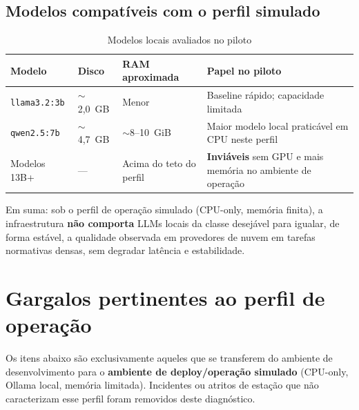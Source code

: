 \documentclass[12pt, a4paper]{article}
\begin{document}
\subsection{Modelos compatíveis com o perfil simulado}

\begin{table}[H]
\centering
\small
\caption{Modelos locais avaliados no piloto}
\label{tab:modelos}
\begin{tabularx}{\textwidth}{
  >{\raggedright\arraybackslash}p{2.6cm}
  >{\centering\arraybackslash}p{2.0cm}
  >{\raggedright\arraybackslash}p{3.2cm}
  >{\raggedright\arraybackslash}X
}
\toprule
\textbf{Modelo} & \textbf{Disco} & \textbf{RAM aproximada} & \textbf{Papel no piloto} \\
\midrule
\texttt{llama3.2:3b} & $\sim$2,0~GB & Menor & Baseline rápido; capacidade limitada \\
\texttt{qwen2.5:7b} & $\sim$4,7~GB & $\sim$8--10~GiB & Maior modelo local praticável em CPU neste perfil \\
Modelos 13B+ & --- & Acima do teto do perfil & \textbf{Inviáveis} sem GPU e mais memória no ambiente de operação \\
\bottomrule
\end{tabularx}
\end{table}

Em suma: sob o perfil de operação simulado (CPU-only, memória finita), a infraestrutura \textbf{não comporta} LLMs locais da classe desejável para igualar, de forma estável, a qualidade observada em provedores de nuvem em tarefas normativas densas, sem degradar latência e estabilidade.

\section{Gargalos pertinentes ao perfil de operação}
\label{sec:gargalos}

Os itens abaixo são exclusivamente aqueles que se transferem do ambiente de desenvolvimento para o \textbf{ambiente de deploy/operação simulado} (CPU-only, Ollama local, memória limitada). Incidentes ou atritos de estação que não caracterizam esse perfil foram removidos deste diagnóstico.
\end{document}
